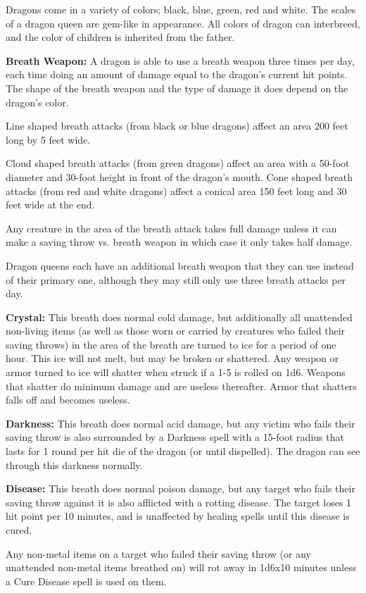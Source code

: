\begin{multicols*}{2}
Dragons come in a variety of colors; black, blue, green, red and white. The scales of a dragon queen are gem-like in appearance. All colors of dragon can interbreed, and the color of children is inherited from the father.

\textbf{Breath Weapon:} A dragon is able to use a breath weapon three times per day, each time doing an amount of damage equal to the dragon’s current hit points. The shape of the breath weapon and the type of damage it does depend on the dragon’s color.

Line shaped breath attacks (from black or blue dragons) affect an area 200 feet long by 5 feet wide.

Cloud shaped breath attacks (from green dragons) affect an area with a 50-foot diameter and 30-foot height in front of the dragon’s mouth. Cone shaped breath attacks (from red and white dragons) affect a conical area 150 feet long and 30 feet wide at the end.

Any creature in the area of the breath attack takes full damage unless it can make a saving throw vs. breath weapon in which case it only takes half damage.

Dragon queens each have an additional breath weapon that they can use instead of their primary one, although they may still only use three breath attacks per day.

\textbf{Crystal:} This breath does normal cold damage, but additionally all unattended non-living items (as well as those worn or carried by creatures who failed their saving throws) in the area of the breath are turned to ice for a period of one hour. This ice will not melt, but may be broken or shattered. Any weapon or armor turned to ice will shatter when struck if a 1-5 is rolled on 1d6. Weapons that shatter do minimum damage and are useless thereafter. Armor that shatters falls off and becomes useless.

\textbf{Darkness:} This breath does normal acid damage, but any victim who fails their saving throw is also surrounded by a Darkness spell with a 15-foot radius that lasts for 1 round per hit die of the dragon (or until dispelled). The dragon can see through this darkness normally.

\textbf{Disease:} This breath does normal poison damage, but any target who fails their saving throw against it is also afflicted with a rotting disease. The target loses 1 hit point per 10 minutes, and is unaffected by healing spells until this disease is cured.

Any non-metal items on a target who failed their saving throw (or any unattended non-metal items breathed on) will rot away in 1d6x10 minutes unless a Cure Disease spell is used on them.


\end{multicols*}
